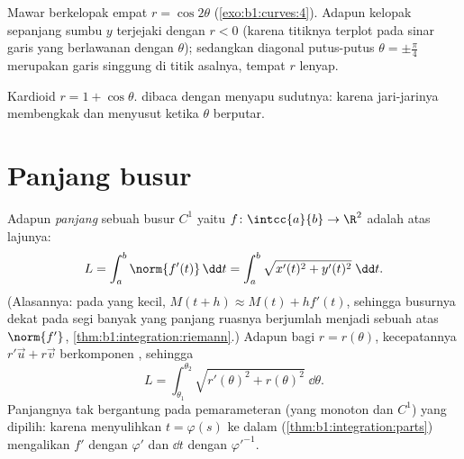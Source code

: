 \begin{omfigure}

{\small Mawar berkelopak empat $r = \cos 2\theta$
(\cref{exo:b1:curves:4}). Adapun kelopak sepanjang sumbu $y$
terjejaki dengan $r < 0$ (karena titiknya terplot pada sinar garis yang berlawanan dengan
$\theta$); sedangkan diagonal putus-putus $\theta = \pm\frac\pi4$ merupakan
garis singgung di titik asalnya, tempat $r$ lenyap.}
\end{omfigure}

\begin{omfigure}

{\small Kardioid $r = 1 + \cos\theta$.  dibaca dengan
menyapu sudutnya: karena jari-jarinya membengkak dan menyusut ketika $\theta$
berputar.}
\end{omfigure}

\section{Panjang busur}

\begin{definition}\label{def:b1:curves:arclength}
Adapun \emph{panjang} sebuah busur $C^1$ yaitu $f \colon
\intcc{a}{b} \to \R^2$ adalah  atas lajunya:
\[
L = \int_a^b \norm{f'(t)}\,\dd t
= \int_a^b \sqrt{x'(t)^2 + y'(t)^2}\;\dd t .
\]
(Alasannya: pada  yang kecil, $M(t + h) \approx M(t) + h
f'(t)$, sehingga busurnya dekat pada segi banyak yang panjang ruasnya berjumlah
menjadi sebuah  atas $\norm{f'}$,
\cref{thm:b1:integration:riemann}.) Adapun bagi  $r =
r(\theta)$, kecepatannya $r'\vec u + r\vec v$ berkomponen
, sehingga
\[
L = \int_{\theta_1}^{\theta_2}
\sqrt{r'(\theta)^2 + r(\theta)^2}\;\dd\theta .
\]
Panjangnya tak bergantung pada pemarameteran (yang monoton dan $C^1$)
yang dipilih: karena menyulihkan $t = \varphi(s)$ ke dalam
 (\cref{thm:b1:integration:parts}) mengalikan $f'$ dengan
$\varphi'$ dan $\dd t$ dengan $\varphi'^{-1}$.
\end{definition}

